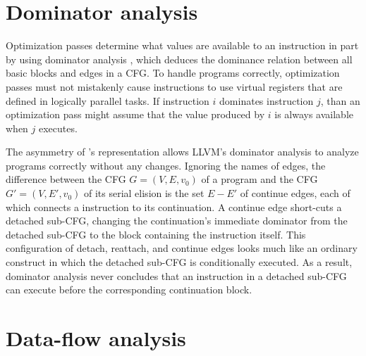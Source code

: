 \section{Dominator analysis}

Optimization passes determine what values are available to an
instruction in part by using dominator analysis
\cite[Ch.~9]{AhoLaSe06}, which deduces the dominance relation between
all basic blocks and edges in a CFG\@.  To handle \tapir programs
correctly, optimization passes must not mistakenly cause instructions
to use virtual registers that are defined in logically parallel tasks.
If instruction $i$ dominates instruction $j$, than an optimization
pass might assume that the value produced by $i$ is always available
when $j$ executes.



The asymmetry of \tapir's representation allows LLVM's dominator
analysis to analyze \tapir programs correctly without any changes.
Ignoring the names of edges, the difference between the CFG
$G=(V,E,v_0)$ of a \tapir program and the CFG $G'=(V,E',v_0)$ of its
serial elision is the set $E-E'$ of continue edges, each of which
connects a \detach instruction to its continuation.  A continue edge
short-cuts a detached sub-CFG, changing the continuation's immediate
dominator from the detached sub-CFG to the block containing the
\detach instruction itself.  This configuration of detach, reattach,
and continue edges looks much like an ordinary  construct in
which the detached sub-CFG is conditionally executed.  As a result,
dominator analysis never concludes that an instruction in a detached
sub-CFG can execute before the corresponding continuation block.




\section{Data-flow analysis}

